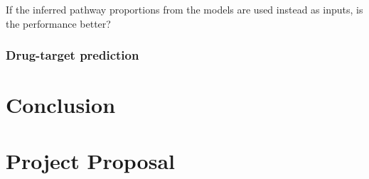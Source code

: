 \documentclass[12pt,a4paper,twoside,openright]{report}
\begin{document}
If the inferred pathway proportions from the models are used instead as inputs, is the performance better?

\subsection{Drug-target prediction}

\chapter{Conclusion}



\appendix

\chapter{Project Proposal}


\end{document}
